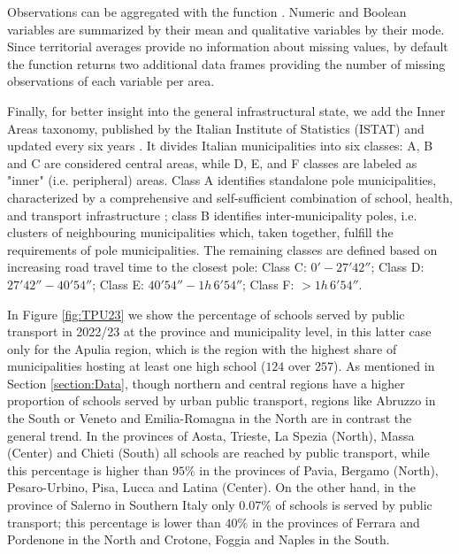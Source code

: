 \documentclass{book}
\begin{document}
Observations can be aggregated with the function \texttt{}. Numeric and Boolean variables are summarized by their mean and qualitative variables by their mode. Since territorial averages provide no information about missing values, by default the function returns two additional data frames providing the number of missing observations of each variable per area.

Finally, for better insight into the general infrastructural state, we add the Inner Areas taxonomy, published by the Italian Institute of Statistics (ISTAT) and updated every six years \citep{InnerAreas}. It divides Italian municipalities into six classes: A, B and C are considered central areas, while D, E, and F classes are labeled as "inner" (i.e. peripheral) areas. Class A identifies standalone pole municipalities, characterized by a comprehensive and self-sufficient combination of school, health, and transport infrastructure \citep{InnerAreas}; class B identifies inter-municipality poles, i.e. clusters of neighbouring municipalities which, taken together, fulfill the requirements of pole municipalities. The remaining classes are defined based on increasing road travel time to the closest pole: Class C: $0' - 27'42''$; Class D: $27'42'' - 40'54''$; Class E: $40'54'' - 1h \, 6' 54''$; Class F: $> 1h \, 6' 54''$.

In Figure \ref{fig:TPU23} we show the percentage of schools served by public transport in 2022/23 at the province and municipality level, in this latter case only for the Apulia region, which is the region with the highest share of municipalities hosting at least one high school ($124$ over $257$). As mentioned in Section \ref{section:Data}, though northern and central regions have a higher proportion of schools served by urban public transport, regions like Abruzzo in the South or Veneto and Emilia-Romagna in the North are in contrast the general trend. In the provinces of Aosta, Trieste, La Spezia (North), Massa (Center) and Chieti (South) all schools are reached by public transport, while this percentage is higher than $95\%$ in the provinces of Pavia, Bergamo (North), Pesaro-Urbino, Pisa, Lucca and Latina (Center). On the other hand, in the province of Salerno in Southern Italy only $0.07\%$ of schools is served by public transport; this percentage is lower than $40\%$ in the provinces of Ferrara and Pordenone in the North and Crotone, Foggia and Naples in the South.%
\end{document}
